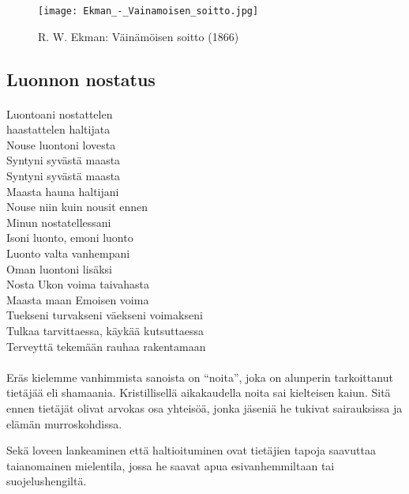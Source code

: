
\vfill%
\begin{figure}[!ht]%
  \centering%
  \texttt{[image: Ekman\_-\_Vainamoisen\_soitto.jpg]}%
  \caption{R. W. Ekman: Väinämöisen soitto (1866)}%
\end{figure}
\vfill%


\clearpage
\subsection{Luonnon nostatus}
  \paragraph{}
  \begin{large}\begin{center}\begin{em}
    Luontoani nostattelen\\
    haastattelen haltijata\\
    Nouse luontoni lovesta\\
    Syntyni syvästä maasta\\
    Syntyni syvästä maasta\\
    \vspace{1em}
    Maasta hauna haltijani\\
    Nouse niin kuin nousit ennen\\
    Minun nostatellessani\\
    \vspace{1em}
    Isoni luonto, emoni luonto\\
    Luonto valta vanhempani\\
    Oman luontoni lisäksi\\
    Nosta Ukon voima taivahasta\\
    Maasta maan Emoisen voima\\
    \vspace{1em}
    Tuekseni turvakseni väekseni voimakseni\\
    Tulkaa tarvittaessa, käykää kutsuttaessa\\
    Terveyttä tekemään rauhaa rakentamaan\\
    \vspace{1em}
  \end{em}\end{center}\end{large}

  \paragraph{}
    Eräs kielemme vanhimmista sanoista on ``noita'', joka on alunperin tarkoittanut tietäjää eli
    shamaania. Kristillisellä aikakaudella noita sai kielteisen kaiun. Sitä ennen tietäjät
    olivat arvokas osa yhteisöä, jonka jäseniä he tukivat sairauksissa ja elämän murroskohdissa.
    \par
    Sekä loveen lankeaminen että haltioituminen ovat tietäjien tapoja saavuttaa taianomainen
    mielentila, jossa he saavat apua esivanhemmiltaan tai suojelushengiltä.

